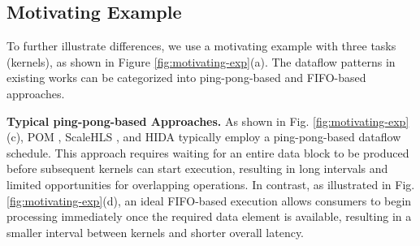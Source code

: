 \documentclass[conference]{IEEEtran}
\begin{document}


\subsection{Motivating Example} \label{sec:moti}
To further illustrate differences, we use a motivating example with three tasks (kernels), as shown in Figure \ref{fig:motivating-exp}(a).
The dataflow patterns in existing works can be categorized into ping-pong-based and FIFO-based approaches.

\textbf{Typical ping-pong-based Approaches.} As shown in Fig. \ref{fig:motivating-exp}(c), POM \cite{zhang2024pom}, ScaleHLS \cite{ye2022scalehls}, and HIDA \cite{ye2024hida} typically employ a ping-pong-based dataflow schedule. 
This approach requires waiting for an entire data block to be produced before subsequent kernels can start execution, resulting in long intervals and limited opportunities for overlapping operations.
In contrast, as illustrated in Fig. \ref{fig:motivating-exp}(d), an ideal FIFO-based execution allows consumers to begin processing immediately once the required data element is available, resulting in a smaller interval between kernels and shorter overall latency.
\end{document}
